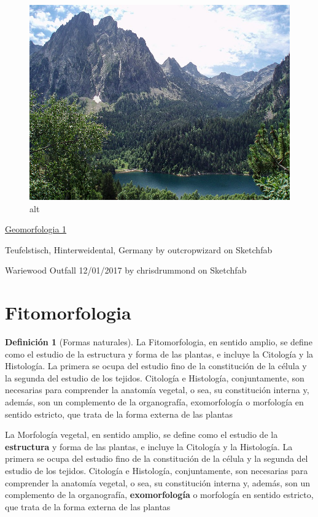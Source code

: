 \documentclass[16pt,]{krantz}
\theoremstyle{definition}
\newtheorem{definition}{Definición}[chapter]
\theoremstyle{definition}
\theoremstyle{definition}
\theoremstyle{definition}
\theoremstyle{remark}
\begin{document}
\begin{figure}
\centering
\includegraphics{geomorfo.jpeg}
\caption{alt}
\end{figure}

\href{https://sketchfab.com/3d-models/eldgos-i-geldingadolum-a-reykjanesskaga-7bcb3d856e1947a4a78c1810f559b3ea}{Geomorfologia 1}

Teufelstisch, Hinterweidental, Germany by outcropwizard on Sketchfab

Wariewood Outfall 12/01/2017 by chrisdrummond on Sketchfab

\hypertarget{fitomorfologia}{%
\section{Fitomorfologia}\label{fitomorfologia}}

\begin{definition}[Formas naturales]
\protect\hypertarget{def:ww3}{}{\label{def:ww3} {} }La Fitomorfologia, en sentido amplio, se define como el estudio de la estructura y forma de las plantas, e incluye la Citología y la Histología. La primera se ocupa del estudio fino de la constitución de la célula y la segunda del estudio de los tejidos. Citología e Histología, conjuntamente, son necesarias para comprender la anatomía vegetal, o sea, su constitución interna y, además, son un complemento de la organografía, exomorfología o morfología en sentido estricto, que trata de la forma externa de las plantas
\end{definition}
La Morfología vegetal, en sentido amplio, se define como el estudio de la \textbf{estructura} y forma de las plantas, e incluye la Citología y la Histología. La primera se ocupa del estudio fino de la constitución de la célula y la segunda del estudio de los tejidos. Citología e Histología, conjuntamente, son necesarias para comprender la anatomía vegetal, o sea, su constitución interna y, además, son un complemento de la organografía, \textbf{exomorfología} o morfología en sentido estricto, que trata de la forma externa de las plantas
\end{document}
